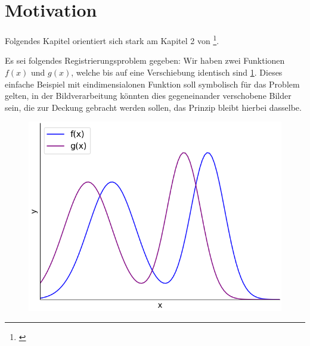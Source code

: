 %
%
%

\section{Motivation
\label{mellin:section:teil1}}

Folgendes Kapitel orientiert sich stark am Kapitel 2 von \footnote{\cite{mellin:mellin-transform-method}}.

Es sei folgendes Registrierungsproblem gegeben: Wir haben zwei Funktionen $f(x)$ und $g(x)$, welche bis auf eine Verschiebung 
identisch sind \ref{fig:mellin:f1}. Dieses einfache Beispiel mit eindimensialonen Funktion soll symbolisch für das Problem gelten,
in der Bildverarbeitung könnten dies gegeneinander verschobene Bilder sein, die zur Deckung gebracht werden sollen, das Prinzip 
bleibt hierbei dasselbe.
\begin{figure}
    \centering
    \includegraphics[width=.5\textwidth]{papers/mellin/images/f1}
    \caption{}
    \label{fig:mellin:f1}
\end{figure}

